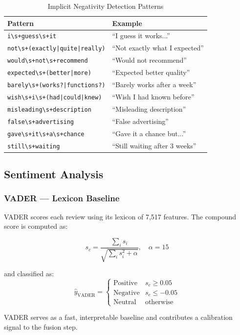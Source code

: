 \begin{justify}
\begin{table}[H]
\centering
\small
\caption{Implicit Negativity Detection Patterns}
\renewcommand{\arraystretch}{1.2}
\begin{tabular}{|l|l|}
\hline
\textbf{Pattern} & \textbf{Example} \\
\hline
\texttt{i\textbackslash s+guess\textbackslash s+it} & ``I guess it works...'' \\
\texttt{not\textbackslash s+(exactly|quite|really)} & ``Not exactly what I expected'' \\
\texttt{would\textbackslash s+not\textbackslash s+recommend} & ``Would not recommend'' \\
\texttt{expected\textbackslash s+(better|more)} & ``Expected better quality'' \\
\texttt{barely\textbackslash s+(works?|functions?)} & ``Barely works after a week'' \\
\texttt{wish\textbackslash s+i\textbackslash s+(had|could|knew)} & ``Wish I had known before'' \\
\texttt{misleading\textbackslash s+description} & ``Misleading description'' \\
\texttt{false\textbackslash s+advertising} & ``False advertising'' \\
\texttt{gave\textbackslash s+it\textbackslash s+a\textbackslash s+chance} & ``Gave it a chance but...'' \\
\texttt{still\textbackslash s+waiting} & ``Still waiting after 3 weeks'' \\
\hline
\end{tabular}
\label{tab:implicit_patterns}
\end{table}
\end{justify}

\subsection{Sentiment Analysis}

\subsubsection{VADER — Lexicon Baseline}
\begin{justify}
VADER \cite{vader} scores each review using its lexicon of 7,517 features. The compound score is computed as:

\begin{equation}
    s_c = \frac{\sum_{i} s_i}{\sqrt{\sum_{i} s_i^2 + \alpha}}, \quad \alpha = 15
\end{equation}

and classified as:
\begin{equation}
    \hat{y}_{\text{VADER}} = \begin{cases} \text{Positive} & s_c \geq 0.05 \\ \text{Negative} & s_c \leq -0.05 \\ \text{Neutral} & \text{otherwise} \end{cases}
\end{equation}

VADER serves as a fast, interpretable baseline and contributes a calibration signal to the fusion step.
\end{justify}

